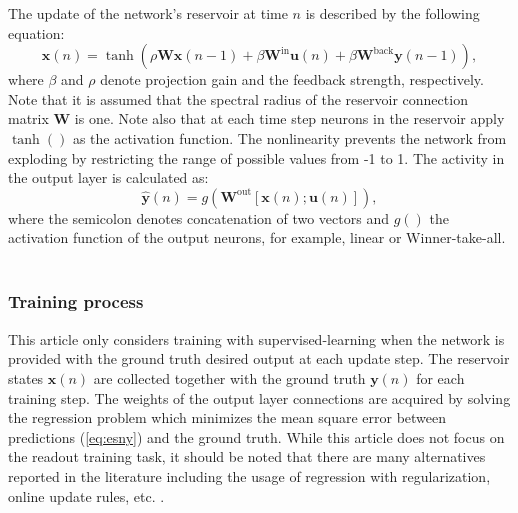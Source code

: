 The update of the network's reservoir at time $n$ is described by the following equation:
~
\begin{equation}
\textbf{x}(n)=\tanh(\rho\textbf{W}\textbf{x}(n-1)+\beta\textbf{W}^{\text{in}}\textbf{u}(n)+\beta\textbf{W}^{\text{back}}\textbf{y}(n-1)),
\label{eq:esnres}
 \end{equation}
where  $\beta$ and $\rho$ denote projection gain and the feedback strength, respectively. Note that it is assumed that the spectral radius of the reservoir connection matrix $\textbf{W}$ is one.
Note also that at each time step neurons in the reservoir apply $\tanh()$ as the activation function.
The nonlinearity prevents the network from exploding by restricting the range of possible values from -1 to 1. The activity in the output layer is calculated as:  
~
\begin{equation}
\hat{\textbf{y}}(n)=g(\textbf{W}^{\text{out}}[\textbf{x}(n);\textbf{u}(n)]),
\label{eq:esny}
 \end{equation}
where the semicolon denotes concatenation of two vectors and $g()$ the activation function of the output neurons, for example, linear or  Winner-take-all.  
~
\subsubsection{Training process}
\label{sect:training}

This article only considers training with supervised-learning when the network is provided with the ground truth desired output at each update step. The reservoir states $\textbf{x}(n)$ are collected together with the ground truth $\textbf{y}(n)$ for each training step. The weights of the output layer connections are acquired by solving the regression problem which minimizes the mean square error between predictions (\ref{eq:esny}) and the ground truth.
While this article does not focus on the readout training task, it should be noted that there are many alternatives reported in the literature including the usage of regression with regularization, online update rules, etc. \cite{ESNtut12}.




